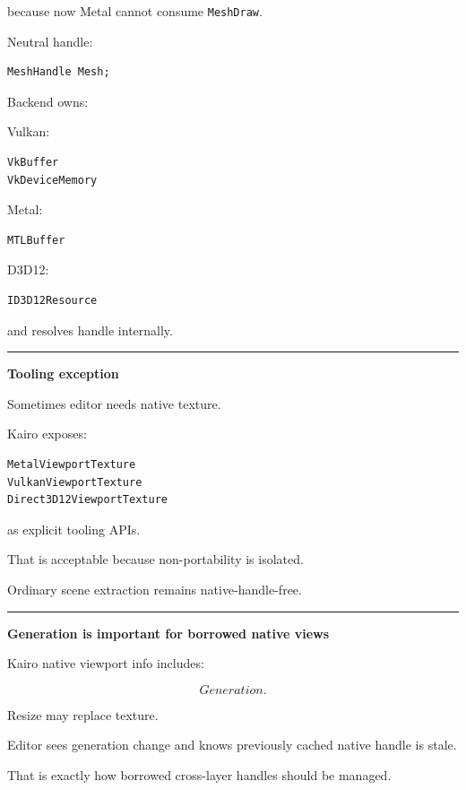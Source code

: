 because now Metal cannot consume \texttt{MeshDraw}.

Neutral handle:

\begin{verbatim}
MeshHandle Mesh;
\end{verbatim}

Backend owns:

Vulkan:

\begin{verbatim}
VkBuffer
VkDeviceMemory
\end{verbatim}

Metal:

\begin{verbatim}
MTLBuffer
\end{verbatim}

D3D12:

\begin{verbatim}
ID3D12Resource
\end{verbatim}

and resolves handle internally.

\begin{center}\rule{0.5\linewidth}{0.5pt}\end{center}

\textbf{Tooling exception}

Sometimes editor needs native texture.

Kairo exposes:

\begin{verbatim}
MetalViewportTexture
VulkanViewportTexture
Direct3D12ViewportTexture
\end{verbatim}

as explicit tooling APIs.

That is acceptable because non-portability is isolated.

Ordinary scene extraction remains native-handle-free.

\begin{center}\rule{0.5\linewidth}{0.5pt}\end{center}

\textbf{Generation is important for borrowed native views}

Kairo native viewport info includes:

\[
Generation.
\]

Resize may replace texture.

Editor sees generation change and knows previously cached native handle is stale.

That is exactly how borrowed cross-layer handles should be managed.

